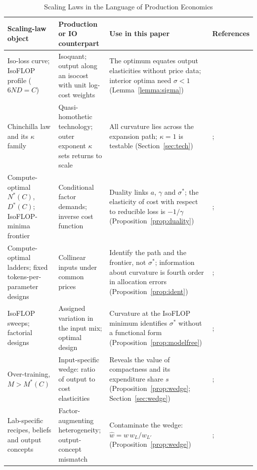 \begin{table}[tp]
\centering
\caption{Scaling Laws in the Language of Production Economics}
\label{tab:dictionary}
\footnotesize
\setlength{\tabcolsep}{3pt}
\begin{tabular}{@{}>{\raggedright\arraybackslash}p{}>{\raggedright\arraybackslash}p{}>{\raggedright\arraybackslash}p{}>{\raggedright\arraybackslash}p{}@{}}
\toprule
Scaling-law object & Production or IO counterpart & Use in this paper & References \\
\midrule
Iso-loss curve; IsoFLOP profile ($6ND=C$) & Isoquant; output along an isocost with unit log-cost weights & The optimum equates output elasticities without price data; interior optima need $\sigma<1$ (Lemma~\ref{lemma:sigma}) & \citealt{shephard1953cost} \\[3pt]
Chinchilla law and its $\kappa$ family & Quasi-homothetic technology; outer exponent $\kappa$ sets returns to scale & All curvature lies across the expansion path; $\kappa=1$ is testable (Section~\ref{sec:tech}) & \citealt{hoffmann2022training}; \citealt{kaplan2020scaling} \\[3pt]
Compute-optimal $N^*(C)$, $D^*(C)$; IsoFLOP-minima frontier & Conditional factor demands; inverse cost function & Duality links $a$, $\gamma$ and $\sigma^*$; the elasticity of cost with respect to reducible loss is $-1/\gamma$ (Proposition~\ref{prop:duality}) & \citealt{uzawa1964duality}; \citealt{nerlove1963returns} \\[3pt]
Compute-optimal ladders; fixed tokens-per-parameter designs & Collinear inputs under common prices & Identify the path and the frontier, not $\sigma^*$; information about curvature is fourth order in allocation errors (Proposition~\ref{prop:ident}) & \citealt{marschak1944random}; \citealt{bond2005adjustment} \\[3pt]
IsoFLOP sweeps; factorial designs & Assigned variation in the input mix; optimal design & Curvature at the IsoFLOP minimum identifies $\sigma^*$ without a functional form (Proposition~\ref{prop:modelfree}) & \citealt{box1959design}; \citealt{kiefer1959optimum} \\[3pt]
Over-training, $M>M^*(C)$ & Input-specific wedge: ratio of output to cost elasticities & Reveals the value of compactness and its expenditure share $s$ (Proposition~\ref{prop:wedge}; Section~\ref{sec:wedge}) & \citealt{deloecker2012markups}; \citealt{raval2023testing} \\[3pt]
Lab-specific recipes, beliefs and output concepts & Factor-augmenting heterogeneity; output-concept mismatch & Contaminate the wedge: $\hat w=w\,w_L/w_{L'}$ (Proposition~\ref{prop:wedge}) & \citealt{demirer2020production}; \citealt{bond2020unpleasant} \\[3pt]

\end{tabular}
\end{table}
